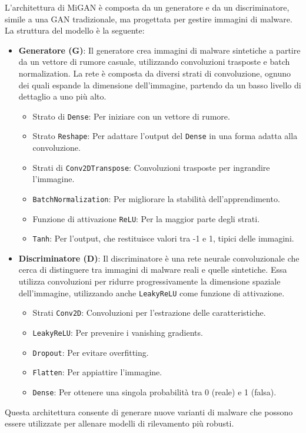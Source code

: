 L'architettura di MiGAN è composta da un generatore e da un discriminatore, simile a una GAN tradizionale, ma progettata per gestire immagini di malware. La struttura del modello è la seguente:
\begin{itemize}
    \item \textbf{Generatore (G)}: Il generatore crea immagini di malware sintetiche a partire da un vettore di rumore casuale, utilizzando convoluzioni trasposte e batch normalization. La rete è composta da diversi strati di convoluzione, ognuno dei quali espande la dimensione dell'immagine, partendo da un basso livello di dettaglio a uno più alto. 
    \begin{itemize}
        \item Strato di \texttt{Dense}: Per iniziare con un vettore di rumore.
        \item Strato \texttt{Reshape}: Per adattare l'output del \texttt{Dense} in una forma adatta alla convoluzione.
        \item Strati di \texttt{Conv2DTranspose}: Convoluzioni trasposte per ingrandire l'immagine.
        \item \texttt{BatchNormalization}: Per migliorare la stabilità dell'apprendimento.
        \item Funzione di attivazione \texttt{ReLU}: Per la maggior parte degli strati.
        \item \texttt{Tanh}: Per l'output, che restituisce valori tra -1 e 1, tipici delle immagini.
    \end{itemize}
    \item \textbf{Discriminatore (D)}: Il discriminatore è una rete neurale convoluzionale che cerca di distinguere tra immagini di malware reali e quelle sintetiche. Essa utilizza convoluzioni per ridurre progressivamente la dimensione spaziale dell'immagine, utilizzando anche \texttt{LeakyReLU} come funzione di attivazione.
    \begin{itemize}
        \item Strati \texttt{Conv2D}: Convoluzioni per l'estrazione delle caratteristiche.
        \item \texttt{LeakyReLU}: Per prevenire i vanishing gradients.
        \item \texttt{Dropout}: Per evitare overfitting.
        \item \texttt{Flatten}: Per appiattire l'immagine.
        \item \texttt{Dense}: Per ottenere una singola probabilità tra 0 (reale) e 1 (falsa).
    \end{itemize}
\end{itemize}
Questa architettura consente di generare nuove varianti di malware che possono essere utilizzate per allenare modelli di rilevamento più robusti.

